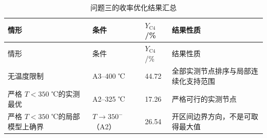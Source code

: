 \begin{longtable}{L{0.27\textwidth}L{0.24\textwidth}C{0.15\textwidth}L{0.23\textwidth}}
\caption{问题三的收率优化结果汇总}\label{tab:q3-conclusion-summary}\\
\toprule
情形 & 条件 & $Y_{\mathrm{C4}}$/\% & 结果性质 \\
\midrule
\endfirsthead
\toprule
情形 & 条件 & $Y_{\mathrm{C4}}$/\% & 结果性质 \\
\midrule
\endhead
无温度限制 & A3--400 ℃ & 44.72 & 全部实测节点排序与局部连续化支持范围 \\
严格 $T<350$ ℃的实测最优 & A2--325 ℃ & 17.26 & 严格可行的实测节点 \\
严格 $T<350$ ℃的局部模型上确界 & $T\to350^-$（A2） & 26.54 & 开区间边界方向，不是可取得最大值 \\
\bottomrule
\end{longtable}
